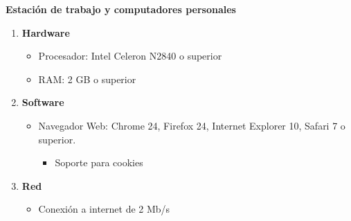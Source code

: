\textbf{Estación de trabajo y computadores personales}
\begin{enumerate}
\item \textbf{Hardware}
\begin{itemize}
\item Procesador: Intel Celeron N2840 o superior
\item RAM: 2 GB o superior
\end{itemize}
\item \textbf{Software}
\begin{itemize}
\item Navegador Web: Chrome 24, Firefox 24, Internet Explorer 10, Safari 7 o superior.
\begin{itemize}
\item Soporte para cookies
\end{itemize}
\end{itemize}

\item \textbf{Red}
\begin{itemize}
\item Conexión a internet de 2 Mb/s
\end{itemize}

\end{enumerate}